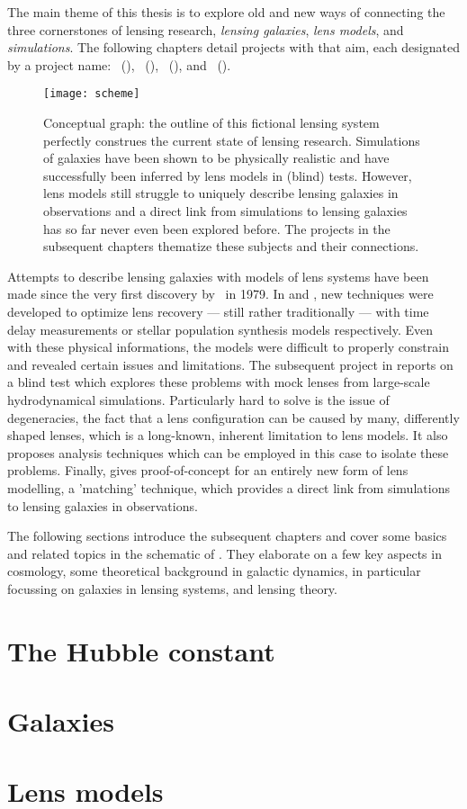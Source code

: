 The main theme of this thesis is to explore old and new ways of connecting the
three cornerstones of lensing research, \textit{lensing galaxies}, \textit{lens
models}, and \textit{simulations}. The following chapters detail projects with
that aim, each designated by a project name: ~(),
~(), ~(), and
~().

\begin{figure}[h]%
    \centering%
    \texttt{[image: scheme]}%
    \caption[Conceptual graph]{Conceptual graph: the outline of this fictional
        lensing system perfectly construes the current state of lensing
        research.  Simulations of galaxies have been shown to be physically
        realistic and have successfully been inferred by lens models in (blind)
        tests.  However, lens models still struggle to uniquely describe lensing
        galaxies in observations and a direct link from simulations to lensing
        galaxies has so far never even been explored before.  The projects in
        the subsequent chapters thematize these subjects and their connections.
        }%
\end{figure}%

Attempts to describe lensing galaxies with models of lens systems have been made
since the very first discovery by~ in 1979.  In
 and , new techniques were developed to optimize
lens recovery --- still rather traditionally --- with time delay measurements or
stellar population synthesis models respectively.  Even with these physical
informations, the models were difficult to properly constrain and revealed
certain issues and limitations.  The subsequent project in  reports
on a blind test which explores these problems with mock lenses from large-scale
hydrodynamical simulations.  Particularly hard to solve is the issue of
degeneracies, the fact that a lens configuration can be caused by many,
differently shaped lenses, which is a long-known, inherent limitation to lens
models.  It also proposes analysis techniques which can be employed in this case
to isolate these problems.  Finally,  gives proof-of-concept for an
entirely new form of lens modelling, a 'matching' technique, which provides a
direct link from simulations to lensing galaxies in observations.

The following sections introduce the subsequent chapters and cover some basics
and related topics in the schematic of .  They elaborate on a
few key aspects in cosmology, some theoretical background in galactic dynamics,
in particular focussing on galaxies in lensing systems, and lensing theory.


\section{The Hubble constant}


\section{Galaxies}


\section{Lens models}

